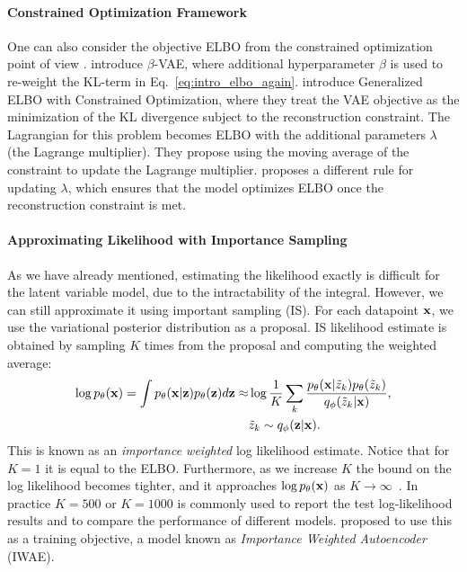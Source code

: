 \paragraph{Constrained Optimization Framework}
One can also consider the objective ELBO from the constrained optimization point of view \citep{higgins2017beta, rezende2018taming}. \citet{higgins2017beta} introduce $\beta$-VAE, where additional hyperparameter $\beta$ is used to re-weight the KL-term in Eq.~\ref{eq:intro_elbo_again}. \citet{rezende2018taming} introduce Generalized ELBO with Constrained Optimization, where they treat the VAE objective as the minimization of the KL divergence subject to the reconstruction constraint. The Lagrangian for this problem becomes ELBO with the additional parameters $\lambda$ (the Lagrange multiplier). They propose using the moving average of the constraint to update the Lagrange multiplier.
\citet{klushyn2019learning} proposes a different rule for updating $\lambda$, which ensures that the model optimizes ELBO once the reconstruction constraint is met. 

\paragraph{Approximating Likelihood with Importance Sampling}
As we have already mentioned, estimating the likelihood exactly is difficult for the latent variable model, due to the intractability of the integral. However, we can still approximate it using important sampling (IS). For each datapoint ${\mathbf{x}}$, we use the variational posterior distribution as a proposal. IS likelihood estimate is obtained by sampling $K$ times from the proposal and computing the weighted average:
\begin{equation}
\begin{aligned}
    \log p_{\theta}({\mathbf{x}}) = \int p_{\theta}({\mathbf{x}}|{\mathbf{z}})p_{\theta}({\mathbf{z}})d{\mathbf{z}} \approx &\log \frac1K \sum_k\frac{p_{\theta}({\mathbf{x}}|\tilde{z}_k)p_{\theta}(\tilde{z}_k)}{q_{\phi}(\tilde{z}_k|{\mathbf{x}})},\\
    &\tilde{z}_k \sim q_{\phi}({\mathbf{z}}|{\mathbf{x}}).
\end{aligned}
\end{equation}
This is known as an \textit{importance weighted} log likelihood estimate. Notice that for $K=1$ it is equal to the ELBO. Furthermore, as we increase $K$ the bound on the log likelihood becomes tighter, and it approaches $\log p_{\theta}({\mathbf{x}})$ as $K \rightarrow \infty$~\citep{burda2015importance}. In practice $K=500$ or $K=1000$ is commonly used to report the test log-likelihood results and to compare the performance of different models. \citet{burda2015importance} proposed to use this as a training objective, a model known as \textit{Importance Weighted Autoencoder} (IWAE). 

